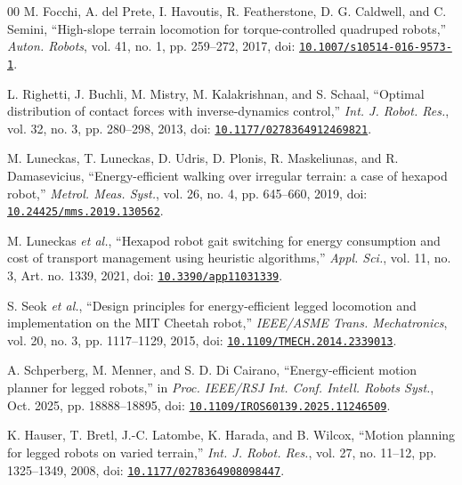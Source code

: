 \documentclass{ieeeaccess}
\begin{document}
\begin{thebibliography}{00}
M. Focchi, A. del Prete, I. Havoutis, R. Featherstone, D. G. Caldwell, and C. Semini, \textquotedblleft{}High-slope terrain locomotion for torque-controlled quadruped robots,\textquotedblright{} \emph{Auton. Robots}, vol. 41, no. 1, pp. 259--272, 2017, doi: \href{https://doi.org/10.1007/s10514-016-9573-1}{\nolinkurl{10.1007/s10514-016-9573-1}}.

L. Righetti, J. Buchli, M. Mistry, M. Kalakrishnan, and S. Schaal, \textquotedblleft{}Optimal distribution of contact forces with inverse-dynamics control,\textquotedblright{} \emph{Int. J. Robot. Res.}, vol. 32, no. 3, pp. 280--298, 2013, doi: \href{https://doi.org/10.1177/0278364912469821}{\nolinkurl{10.1177/0278364912469821}}.

M. Luneckas, T. Luneckas, D. Udris, D. Plonis, R. Maskeliunas, and R. Damasevicius, \textquotedblleft{}Energy-efficient walking over irregular terrain: a case of hexapod robot,\textquotedblright{} \emph{Metrol. Meas. Syst.}, vol. 26, no. 4, pp. 645--660, 2019, doi: \href{https://doi.org/10.24425/mms.2019.130562}{\nolinkurl{10.24425/mms.2019.130562}}.

M. Luneckas \emph{et al.}, \textquotedblleft{}Hexapod robot gait switching for energy consumption and cost of transport management using heuristic algorithms,\textquotedblright{} \emph{Appl. Sci.}, vol. 11, no. 3, Art. no. 1339, 2021, doi: \href{https://doi.org/10.3390/app11031339}{\nolinkurl{10.3390/app11031339}}.

S. Seok \emph{et al.}, \textquotedblleft{}Design principles for energy-efficient legged locomotion and implementation on the MIT Cheetah robot,\textquotedblright{} \emph{IEEE/ASME Trans. Mechatronics}, vol. 20, no. 3, pp. 1117--1129, 2015, doi: \href{https://doi.org/10.1109/TMECH.2014.2339013}{\nolinkurl{10.1109/TMECH.2014.2339013}}.

A. Schperberg, M. Menner, and S. D. Di Cairano, \textquotedblleft{}Energy-efficient motion planner for legged robots,\textquotedblright{} in \emph{Proc. IEEE/RSJ Int. Conf. Intell. Robots Syst.}, Oct. 2025, pp. 18888--18895, doi: \href{https://doi.org/10.1109/IROS60139.2025.11246509}{\nolinkurl{10.1109/IROS60139.2025.11246509}}.

K. Hauser, T. Bretl, J.-C. Latombe, K. Harada, and B. Wilcox, \textquotedblleft{}Motion planning for legged robots on varied terrain,\textquotedblright{} \emph{Int. J. Robot. Res.}, vol. 27, no. 11--12, pp. 1325--1349, 2008, doi: \href{https://doi.org/10.1177/0278364908098447}{\nolinkurl{10.1177/0278364908098447}}.


\end{thebibliography}
\end{document}
